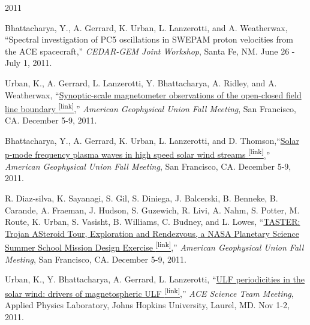 \begin{center} \Large{2011} \end{center}
\normalsize
\begin{itemize*}

  \item Bhattacharya, Y., A. Gerrard, K. Urban, L. Lanzerotti, and A.
    Weatherwax, ``Spectral investigation of PC5 oscillations in SWEPAM proton
    velocities from the ACE spacecraft,'' {\em CEDAR-GEM Joint
    Workshop}, Santa Fe, NM. June 26 - July 1, 2011.

  \item Urban, K., A. Gerrard, L. Lanzerotti, Y. Bhattacharya, A. Ridley, and A.
    Weatherwax,
    ``\href{https://scholar.google.com/citations?view_op=view_citation&hl=en&user=KTLuoQkAAAAJ&citation_for_view=KTLuoQkAAAAJ:Y0pCki6q_DkC}{Synoptic-scale magnetometer observations of the open-closed
    field line boundary \textsuperscript{\tiny{[link]}}},'' {\em American Geophysical Union Fall
    Meeting}, San Francisco, CA. December 5-9, 2011.

  \item
    Bhattacharya, Y., A. Gerrard, K. Urban, L. Lanzerotti, and D.
    Thomson,``\href{https://scholar.google.com/citations?view_op=view_citation&hl=en&user=KTLuoQkAAAAJ&citation_for_view=KTLuoQkAAAAJ:YsMSGLbcyi4C}{Solar
    p-mode frequency plasma waves in high speed solar wind streams \textsuperscript{\tiny{[link]}}},''
    {\em American Geophysical Union Fall Meeting}, San Francisco,
    CA. December 5-9, 2011.

  \item
    R. Diaz-silva, K. Sayanagi, S. Gil, S. Diniega, J. Balcerski, B. Benneke,
    B. Carande, A. Fraeman, J. Hudson, S. Guzewich, R. Livi, A. Nahm, S.
    Potter, M. Route, K. Urban, S. Vasisht, B. Williams, C. Budney, and L.
    Lowes,
    ``\href{https://scholar.google.com/citations?view_op=view_citation&hl=en&user=KTLuoQkAAAAJ&citation_for_view=KTLuoQkAAAAJ:W7OEmFMy1HYC}{TASTER:
    Trojan ASteroid Tour, Exploration and Rendezvous, a NASA Planetary
    Science Summer School Mission Design Exercise \textsuperscript{\tiny{[link]}}},'' {\em American
    Geophysical Union Fall Meeting}, San Francisco, CA. December
    5-9, 2011.

  \item Urban, K., Y. Bhattacharya, A. Gerrard, L. Lanzerotti,
    ``\href{http://www.srl.caltech.edu/ACE/meetings/Nov.2011meeting/}{ULF
    periodicities in the solar wind: drivers of magnetospheric
    ULF \textsuperscript{\tiny{[link]}}},'' {\em ACE Science Team Meeting}, Applied Physics Laboratory, Johns Hopkins
    University, Laurel, MD. Nov 1-2, 2011.


\end{itemize*}
